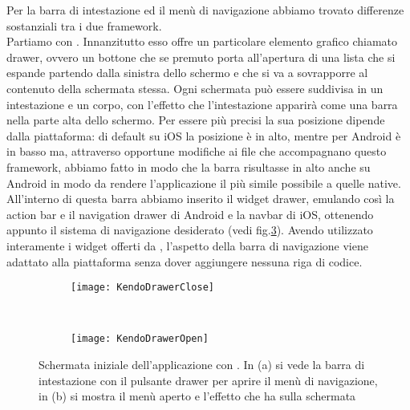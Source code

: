             Per la barra di intestazione ed il menù di navigazione abbiamo trovato
            differenze sostanziali tra i due framework.\\
            Partiamo con \kendomob{}.
            Innanzitutto esso offre un particolare elemento grafico chiamato drawer,
            ovvero un bottone che se premuto porta all'apertura di
            una lista che si espande partendo dalla sinistra dello schermo e che
            si va a sovrapporre al contenuto della schermata stessa.
            Ogni schermata può essere suddivisa in un intestazione e un corpo,
            con l'effetto che l'intestazione apparirà come una barra nella parte alta
            dello schermo. Per essere più precisi la sua posizione dipende dalla
            piattaforma: di default su iOS la posizione è in alto, mentre per Android
            è in basso ma, attraverso opportune modifiche ai file \css{} che accompagnano
            questo framework, abbiamo fatto in modo che la barra risultasse in alto
            anche su Android in modo da rendere l'applicazione il più simile possibile
            a quelle native.
            All'interno di questa barra abbiamo inserito il widget drawer, emulando
            così la action bar e il navigation drawer di Android e la navbar di iOS,
            ottenendo appunto il sistema di navigazione desiderato (vedi fig.\ref{fig:kendodrawer}).
            Avendo utilizzato interamente i widget offerti da \kendomob{}, l'aspetto
            della barra di navigazione viene adattato alla piattaforma senza
            dover aggiungere nessuna riga di codice.
            \begin{figure}[h]
                \centering
                \begin{subfigure}[b]{0.485\textwidth}
                    \texttt{[image: KendoDrawerClose]}
                    \caption{}
                    \label{fig:kendoDrawerClose}
                \end{subfigure}
                ~
                \begin{subfigure}[b]{0.485\textwidth}
                    \texttt{[image: KendoDrawerOpen]}
                    \caption{}
                    \label{fig:kendoDrawerOpen}
                \end{subfigure}
                \caption{Schermata iniziale dell'applicazione con \kendomob{}.
                In (a) si vede la barra di intestazione con il pulsante drawer
                per aprire il menù di navigazione, in (b) si mostra il menù aperto
                e l'effetto che ha sulla schermata}
                \label{fig:kendodrawer}
            \end{figure}

